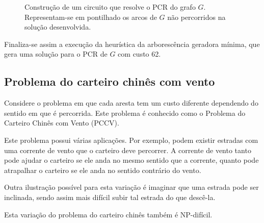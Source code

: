 \begin{enumerate}
\begin{figure}[H]
            \caption{Construção de um circuito que resolve o PCR do grafo $G$. Representam-se em pontilhado os arcos de $G$ não percorridos na solução desenvolvida.}
            \label{solucaoPCR}
        \end{figure}
	\end{enumerate}

    Finaliza-se assim a execução da heurística da arborescência geradora mínima, que gera uma solução para o PCR de $G$ com custo 62.

    \subsection{Problema do carteiro chinês com vento}

        Considere o problema em que cada aresta tem um custo diferente dependendo do sentido em que é percorrida. Este problema é conhecido como o Problema do Carteiro Chinês com Vento (PCCV).

        Este problema possui várias aplicações. 
        Por exemplo, podem existir estradas com uma corrente de vento que o carteiro deve percorrer. 
        A corrente de vento tanto pode ajudar o carteiro se ele anda no mesmo sentido que a corrente, quanto pode atrapalhar o carteiro se ele anda no sentido contrário do vento.

        Outra ilustração possível para esta variação é imaginar que uma estrada pode ser inclinada, sendo assim mais difícil subir tal estrada do que descê-la.

        Esta variação do problema do carteiro chinês também é NP-difícil.

